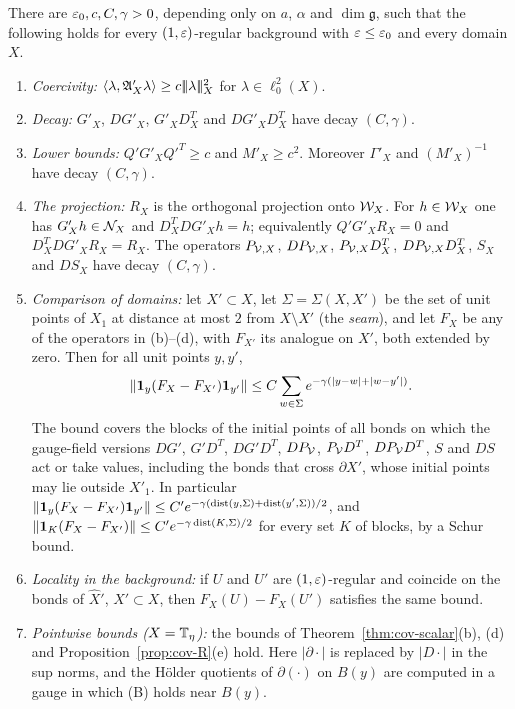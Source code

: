 \begin{theorem}\label{thm:reg-scalar}
There are $\varepsilon_0,c,C,\gamma>0$, depending only on $a$, $\alpha$ and $\dim\mathfrak g$, such that the following holds for every $(1,\varepsilon)$-regular background with $\varepsilon\le\varepsilon_0$ and every domain $X$.
\begin{enumerate}[label=(\alph*)]
\item \emph{Coercivity:} $\langle \lambda,\mathfrak A'_X\lambda\rangle\ge c|\!|\!|\lambda|\!|\!|_X^2$ for $\lambda\in\ell^2_0(X)$.
\item \emph{Decay:} $G'_X$, $DG'_X$, $G'_XD^T_X$ and $DG'_XD^T_X$ have decay $(C,\gamma)$.
\item \emph{Lower bounds:} $Q'G'_XQ'^T\ge c$ and $M'_X\ge c^2$. Moreover $\Gamma'_X$ and $(M'_X)^{-1}$ have decay $(C,\gamma)$.
\item \emph{The projection:} $R_X$ is the orthogonal projection onto $\mathcal W_X$. For $h\in\mathcal W_X$ one has $G'_Xh\in\mathcal N_X$ and $D^T_XDG'_Xh=h$; equivalently $Q'G'_XR_X=0$ and $D^T_XDG'_XR_X=R_X$. The operators $P_{\mathcal V,X}$, $DP_{\mathcal V,X}$, $P_{\mathcal V,X}D^T_X$, $DP_{\mathcal V,X}D^T_X$, $S_X$ and $DS_X$ have decay $(C,\gamma)$.
\item \emph{Comparison of domains:} let $X'\subset X$, let $\Sigma=\Sigma(X,X')$ be the set of unit points of $X_1$ at distance at most $2$ from $X\setminus X'$ (the \emph{seam}), and let $F_X$ be any of the operators in (b)--(d), with $F_{X'}$ its analogue on $X'$, both extended by zero. Then for all unit points $y,y'$,
\[
\|\mathbf 1_y(F_X-F_{X'})\mathbf 1_{y'}\|\le C\sum_{w\in\Sigma}e^{-\gamma(|y-w|+|w-y'|)}.
\]
The bound covers the blocks of the initial points of all bonds on which the gauge-field versions $DG'$, $G'D^T$, $DG'D^T$, $DP_\mathcal V$, $P_\mathcal V D^T$, $DP_\mathcal V D^T$, $S$ and $DS$ act or take values, including the bonds that cross $\partial X'$, whose initial points may lie outside $X'_1$. In particular $\|\mathbf 1_y(F_X-F_{X'})\mathbf 1_{y'}\|\le C'e^{-\gamma(\operatorname{dist}(y,\Sigma)+\operatorname{dist}(y',\Sigma))/2}$, and $\|\mathbf 1_K(F_X-F_{X'})\|\le C'e^{-\gamma\operatorname{dist}(K,\Sigma)/2}$ for every set $K$ of blocks, by a Schur bound.
\item \emph{Locality in the background:} if $U$ and $U'$ are $(1,\varepsilon)$-regular and coincide on the bonds of $\hat X'$, $X'\subset X$, then $F_X(U)-F_X(U')$ satisfies the same bound.
\item \emph{Pointwise bounds ($X=\mathbb T_\eta$):} the bounds of Theorem~\ref{thm:cov-scalar}(b), (d) and Proposition~\ref{prop:cov-R}(e) hold. Here $|\partial\cdot|$ is replaced by $|D\cdot|$ in the sup norms, and the H\"older quotients of $\partial(\cdot)$ on $B(y)$ are computed in a gauge in which (B) holds near $B(y)$.
\end{enumerate}
\end{theorem}

